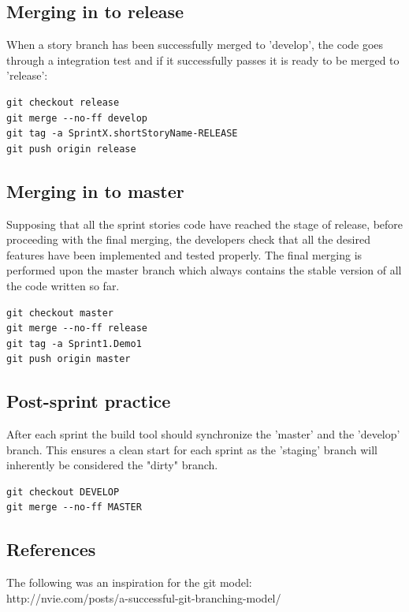 \subsection{Merging in to release}
When a story branch has been successfully merged to 'develop', the code goes through a integration test and if it successfully passes it is ready to be merged to 'release': 
\begin{verbatim}
git checkout release
git merge --no-ff develop
git tag -a SprintX.shortStoryName-RELEASE
git push origin release
\end{verbatim}
\subsection{Merging in to master}
Supposing that all the sprint stories code have reached the stage of release, before proceeding with the final merging, the developers check that all the desired features have been implemented and tested properly.
The final merging is performed upon the master branch which always contains the stable version of all the code written so far.
  \begin{verbatim}
git checkout master
git merge --no-ff release
git tag -a Sprint1.Demo1
git push origin master
\end{verbatim}
\subsection{Post-sprint practice}

After each sprint the build tool should synchronize the 'master' and the 'develop' branch. This ensures a clean start for each sprint as the 'staging' branch will inherently be considered the "dirty" branch. 

  \begin{verbatim}
git checkout DEVELOP
git merge --no-ff MASTER
\end{verbatim}

\subsection{References}
The following was an inspiration for the git model:\\

http://nvie.com/posts/a-successful-git-branching-model/
 \\
